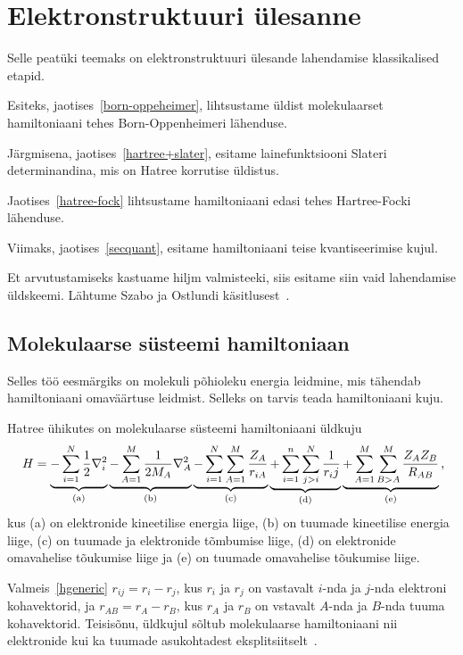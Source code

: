 \documentclass[12pt]{report}
\begin{document}
\chapter{Elektronstruktuuri ülesanne}\label{chap:esp}

Selle peatüki teemaks on elektronstruktuuri ülesande lahendamise klassikalised etapid.

Esiteks, jaotises~\ref{born-oppeheimer}, lihtsustame üldist molekulaarset hamiltoniaani tehes Born-Oppenheimeri lähenduse.

Järgmisena, jaotises~\ref{hartree+slater}, esitame lainefunktsiooni Slateri determinandina, mis on Hatree korrutise üldistus.

Jaotises~\ref{hatree-fock} lihtsustame hamiltoniaani edasi tehes Hartree-Focki lähenduse.

Viimaks, jaotises~\ref{secquant}, esitame hamiltoniaani teise kvantiseerimise kujul.

Et arvutustamiseks kastuame hiljm valmisteeki, siis esitame siin vaid lahendamise üldskeemi.
Lähtume Szabo ja Ostlundi käsitlusest~\cite{szabo+ostlund}.

\section{Molekulaarse süsteemi hamiltoniaan}

Selles töö eesmärgiks on molekuli põhioleku energia leidmine, mis tähendab hamiltoniaani omaväärtuse leidmist.
Selleks on tarvis teada hamiltoniaani kuju.

Hatree ühikutes on molekulaarse süsteemi hamiltoniaani üldkuju
\begin{equation}\label{hgeneric}
    H = \underbrace{-\sum_{i=1}^N\frac{1}{2}\nabla_i^2}_\mathrm{(a)}
        \underbrace{-\sum_{A=1}^M\frac{1}{2M_A}\nabla_A^2}_\mathrm{(b)}
        \underbrace{-\sum_{i=1}^N\sum_{A=1}^M\frac{Z_A}{r_{iA}}}_\mathrm{(c)}
        \underbrace{+\sum_{i=1}^n\sum_{j>i}^N\frac{1}{r_ij}}_\mathrm{(d)}
        \underbrace{+\sum_{A=1}^M\sum_{B>A}^M\frac{Z_AZ_B}{R_{AB}}}_\mathrm{(e)}\rlap{,}
\end{equation}
kus (a) on elektronide kineetilise energia liige, (b) on tuumade kineetilise energia liige, (c) on tuumade ja elektronide tõmbumise liige, (d) on elektronide omavahelise tõukumise liige ja (e) on tuumade omavahelise tõukumise liige.

Valmeis~\eqref{hgeneric} \(r_{ij} = r_i - r_j\), kus \(r_i\) ja \(r_j\) on vastavalt \(i\)-nda ja \(j\)-nda elektroni kohavektorid, ja \(r_{AB} = r_A - r_B\), kus \(r_A\) ja \(r_B\) on vstavalt \(A\)-nda ja \(B\)-nda tuuma kohavektorid.
Teisisõnu, üldkujul sõltub molekulaarse hamiltoniaani nii elektronide kui ka tuumade asukohtadest eksplitsiitselt~\cite{szabo+ostlnud}.
\end{document}
